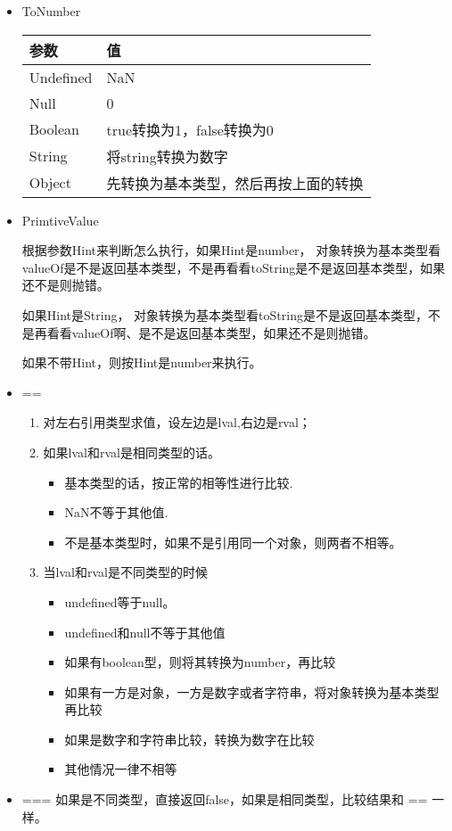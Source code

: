 \begin{itemize}
\item ToNumber

\begin{tabular}{|l|l|}
\hline
参数 & 值 \\
\hline
Undefined & NaN \\
\hline
Null & 0 \\
\hline
Boolean & true转换为1，false转换为0 \\
\hline
String & 将string转换为数字 \\
\hline
Object & 先转换为基本类型，然后再按上面的转换 \\
\hline
\end{tabular}

\item PrimtiveValue

根据参数Hint来判断怎么执行，如果Hint是number，
对象转换为基本类型看valueOf是不是返回基本类型，不是再看看toString是不是返回基本类型，如果还不是则抛错。

如果Hint是String，
对象转换为基本类型看toString是不是返回基本类型，不是再看看valueOf啊、是不是返回基本类型，如果还不是则抛错。

如果不带Hint，则按Hint是number来执行。
\end{itemize}

\begin{itemize}
\item == 

\begin{enumerate}
\item 对左右引用类型求值，设左边是lval,右边是rval；
\item 如果lval和rval是相同类型的话。
	\begin{itemize}
	\item 基本类型的话，按正常的相等性进行比较.
	\item NaN不等于其他值.
	\item 不是基本类型时，如果不是引用同一个对象，则两者不相等。
	\end{itemize}
\item 当lval和rval是不同类型的时候
	\begin{itemize}
	\item undefined等于null。
	\item undefined和null不等于其他值
	\item 如果有boolean型，则将其转换为number，再比较
	\item 如果有一方是对象，一方是数字或者字符串，将对象转换为基本类型再比较
	\item 如果是数字和字符串比较，转换为数字在比较
	\item 其他情况一律不相等
	\end{itemize}
\end{enumerate}

\item ===
如果是不同类型，直接返回false，如果是相同类型，比较结果和 == 一样。
\end{itemize}

